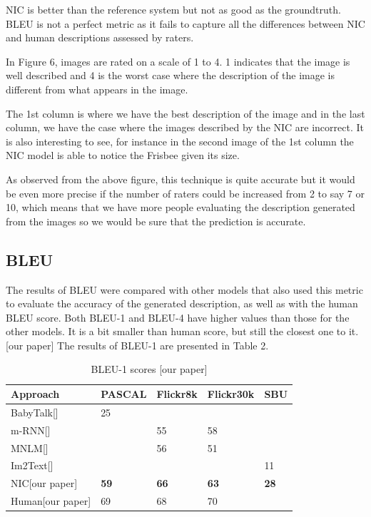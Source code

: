 \documentclass[a4paper,UKenglish,cleveref, autoref, thm-restate]{lipics-v2021}
\begin{document}
NIC is better than the reference system but not as good as the groundtruth. BLEU is not a perfect metric as it fails to capture all the differences between NIC and human descriptions assessed by raters.

In Figure 6, images are rated on a scale of 1 to 4. 1 indicates that the image is well described and 4 is the worst case where the description of the image is different from what appears in the image.

The 1st column is where we have the best description of the image and in the last column, we have the case where the images described by the NIC are incorrect. It is also interesting to see, for instance in the second image of the 1st column the NIC model is able to notice the Frisbee given its size.

As observed from the above figure, this technique is quite accurate but it would be even more precise if the number of raters could be increased from 2 to say 7 or 10, which means that we have more people evaluating the description generated from the images so we would be sure that the prediction is accurate.

\subsection{BLEU}
The results of BLEU were compared with other models that also used this metric to evaluate the accuracy of the generated description, as well as with the human BLEU score. Both BLEU-1 and BLEU-4 have higher values than those for the other models. It is a bit smaller than human score, but still the closest one to it. [our paper] The results of BLEU-1 are presented in Table 2.

\begin{table}
\centering
\begin{tabular}{ |p{3cm}||p{2cm}|p{2cm}|p{2cm}|p{2cm}| }
    \hline
     \centering
     Approach & PASCAL & Flickr8k & Flickr30k & SBU \\
     \hline
     BabyTalk[] & 25 &    &    &     \\
     m-RNN[]    &    & 55 & 58 &     \\
     MNLM[]     &    & 56 & 51 &     \\
     Im2Text[]  &    &    &    & 11  \\
     \hline
     NIC[our paper] & \textbf{59} & \textbf{66} & \textbf{63} & \textbf{28}  \\
     \hline
     Human[our paper] & 69 & 68 & 70 & \\
     \hline
\end{tabular}
\caption{BLEU-1 scores [our paper]}
\end {table}
\end{document}
